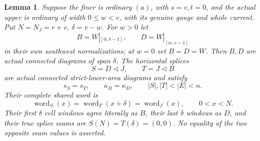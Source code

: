 \documentclass[11pt,a4paper]{amsart}
\numberwithin{equation}{section}
\theoremstyle{plain}
\newtheorem{lemma}[theorem]{Lemma}
\theoremstyle{definition}
\begin{document}
\begin{lemma}\label{ph:endpoint-splice}
Suppose the finer is ordinary \((a)\), with \(s=v,t=0\), and the actual
upper is ordinary of width \(0\le w<v\), with its genuine gauge and
whole current.  Put \(N=N_J=r+v\), \(\delta=v-w\).
For \(w>0\) let
\[
 B=W|_{[0,\delta-1]},\qquad D=W|_{[w,v-1]}
\]
in their own southwest normalizations; at \(w=0\) set \(B=D=W\).
Then \(B,D\) are actual connected diagrams of span \(\delta\).
The horizontal splices
\[
 S=D\triangleleft J,\qquad T=J\triangleleft B
\]
are actual connected strict-lower-area diagrams and satisfy
\[
 s_S=s_T,\qquad \kappa_B=\kappa_D,\qquad
 |S|,|T|<|E|<n.
\]
Their complete shared word is
\[
 \operatorname{word}_S(x)=\operatorname{word}_T(x+\delta)
        =\operatorname{word}_J(x),\qquad 0<x<N.
\]
Their first \(\delta\) cell windows agree literally as \(B\), their last
\(\delta\) windows as \(D\), and their true splice seams are
\(S(N)=T(\delta)=(0,0)\).  No equality of the two opposite seam values
is asserted.
\end{lemma}
\end{document}
